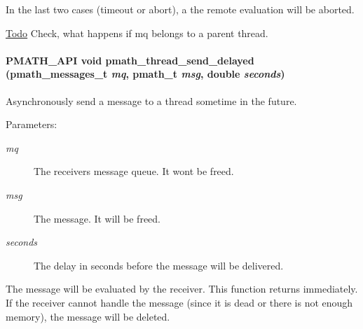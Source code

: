 In the last two cases (timeout or abort), a the remote evaluation will be aborted.

\begin{Desc}
\item[\hyperlink{todo__todo000002}{Todo}]Check, what happens if mq belongs to a parent thread. \end{Desc}
\hypertarget{group__threadmsg_g75339d9dd1902293cb72b38e77caa742}{
\paragraph[{pmath\_\-thread\_\-send\_\-delayed}]{\setlength{\rightskip}{0pt plus 5cm}PMATH\_\-API void pmath\_\-thread\_\-send\_\-delayed ({\bf pmath\_\-messages\_\-t} {\em mq}, \/  {\bf pmath\_\-t} {\em msg}, \/  double {\em seconds})}\hfill}
\label{group__threadmsg_g75339d9dd1902293cb72b38e77caa742}


Asynchronously send a message to a thread sometime in the future. 

\begin{Desc}
\item[Parameters:]
\begin{description}
\item[{\em mq}]The receivers message queue. It wont be freed. \item[{\em msg}]The message. It will be freed. \item[{\em seconds}]The delay in seconds before the message will be delivered.\end{description}
\end{Desc}
The message will be evaluated by the receiver. This function returns immediately. If the receiver cannot handle the message (since it is dead or there is not enough memory), the message will be deleted. 